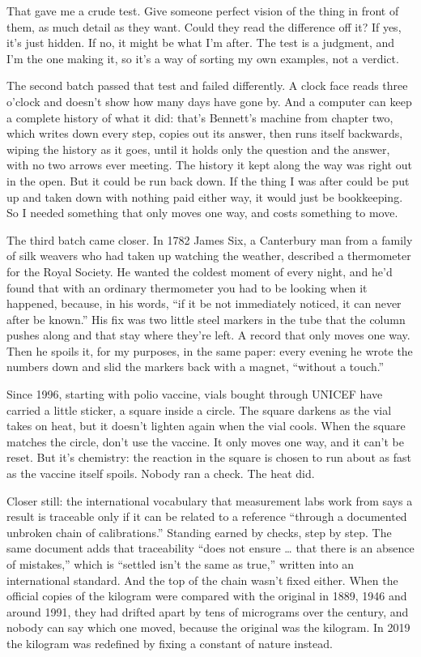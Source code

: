 \documentclass[11pt,twoside]{article}
\theoremstyle{thielethm}
\theoremstyle{thieledef}
\theoremstyle{thieledef}
\theoremstyle{thieledef}
\theoremstyle{thielethm}
\theoremstyle{thieleobs}
\theoremstyle{thielethm}
\begin{document}
That gave me a crude test. Give someone perfect vision of the thing in front of them, as much detail as they want. Could they read the difference off it? If yes, it's just hidden. If no, it might be what I'm after. The test is a judgment, and I'm the one making it, so it's a way of sorting my own examples, not a verdict.

The second batch passed that test and failed differently. A clock face reads three o'clock and doesn't show how many days have gone by. And a computer can keep a complete history of what it did: that's Bennett's machine from chapter two, which writes down every step, copies out its answer, then runs itself backwards, wiping the history as it goes, until it holds only the question and the answer, with no two arrows ever meeting. The history it kept along the way was right out in the open. But it could be run back down. If the thing I was after could be put up and taken down with nothing paid either way, it would just be bookkeeping. So I needed something that only moves one way, and costs something to move.

The third batch came closer. In 1782 James Six, a Canterbury man from a family of silk weavers who had taken up watching the weather, described a thermometer for the Royal Society. He wanted the coldest moment of every night, and he'd found that with an ordinary thermometer you had to be looking when it happened, because, in his words, ``if it be not immediately noticed, it can never after be known.'' His fix was two little steel markers in the tube that the column pushes along and that stay where they're left. A record that only moves one way. Then he spoils it, for my purposes, in the same paper: every evening he wrote the numbers down and slid the markers back with a magnet, ``without a touch.''

Since 1996, starting with polio vaccine, vials bought through UNICEF have carried a little sticker, a square inside a circle. The square darkens as the vial takes on heat, but it doesn't lighten again when the vial cools. When the square matches the circle, don't use the vaccine. It only moves one way, and it can't be reset. But it's chemistry: the reaction in the square is chosen to run about as fast as the vaccine itself spoils. Nobody ran a check. The heat did.

Closer still: the international vocabulary that measurement labs work from says a result is traceable only if it can be related to a reference ``through a documented unbroken chain of calibrations.'' Standing earned by checks, step by step. The same document adds that traceability ``does not ensure \ldots{} that there is an absence of mistakes,'' which is ``settled isn't the same as true,'' written into an international standard. And the top of the chain wasn't fixed either. When the official copies of the kilogram were compared with the original in 1889, 1946 and around 1991, they had drifted apart by tens of micrograms over the century, and nobody can say which one moved, because the original was the kilogram. In 2019 the kilogram was redefined by fixing a constant of nature instead.
\end{document}
